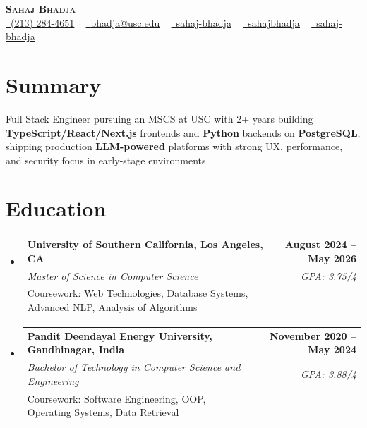 \documentclass[letterpaper,10pt]{article}
\makeatletter
\newcommand{\resumeEduSubheading}[5]{\vspace{-1pt}\item\begin{tabular*}{1.0\textwidth}[t]{l@{\extracolsep{\fill}}r}\textbf{#1} & \textbf{\small #2} \\\textit{\small #3} & \textit{\small #4} \\\small #5 & \\\end{tabular*}\vspace{-4pt}}
\newcommand{\resumeSubHeadingListStart}{\begin{itemize}[leftmargin=0.0in, label={}]}
\newcommand{\resumeSubHeadingListEnd}{\end{itemize}}
\makeatother
\begin{document}
\begin{center}
{\Huge \scshape \textbf{Sahaj Bhadja}} \\ \vspace{1pt}
\small \href{tel:(213) 284-4651}{\faPhone\ \underline{(213) 284-4651}} ~ \href{mailto: bhadja@usc.edu}{\raisebox{-0.2\height}\faEnvelope\ \underline{bhadja@usc.edu}} ~
\href{https://www.linkedin.com/in/sahaj-bhadja/}{\raisebox{-0.2\height}\faLinkedin\ \underline{sahaj-bhadja}} ~ \href{https://github.com/SAHAJ-BHADJA}{\raisebox{-0.2\height}\faGithub\ \underline{sahajbhadja}} ~
\href{https://sahaj-bhadja.vercel.app/}{\raisebox{-0.2\height}\faGlobe\ \underline{sahaj-bhadja}}
\end{center}
\vspace{-16pt}
\section{Summary}
\begin{itemize}[leftmargin=0.15in, label={}]
\small{\item{Full Stack Engineer pursuing an MSCS at USC with 2+ years building \textbf{TypeScript/React/Next.js} frontends and \textbf{Python} backends on \textbf{PostgreSQL}, shipping production \textbf{LLM-powered} platforms with strong UX, performance, and security focus in early-stage environments.}}
\end{itemize}
\vspace{-6pt}
\section{Education}
\resumeSubHeadingListStart
\resumeEduSubheading{University of Southern California, Los Angeles, CA}{August 2024 -- May 2026}{Master of Science in Computer Science}{GPA: 3.75/4}{Coursework: Web Technologies, Database Systems, Advanced NLP, Analysis of Algorithms}
\vspace{-9pt}
\resumeEduSubheading{Pandit Deendayal Energy University, Gandhinagar, India}{November 2020 -- May 2024}{Bachelor of Technology in Computer Science and Engineering}{GPA: 3.88/4}{Coursework: Software Engineering, OOP, Operating Systems, Data Retrieval}
\resumeSubHeadingListEnd
\vspace{-6pt}
\end{document}
